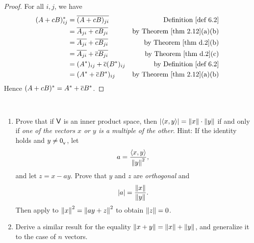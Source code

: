 \begin{proof}
For all \(i, j\), we have
\begin{align*}
    (A + cB)^*_{ij} & = \conjugatet{(A + cB)_{ji}} & \text{\DEF{6.2}} \\
    & = \conjugatet{A_{ji} + cB_{ji}} & \text{by \THM{2.12}(a)(b)} \\
    & = \conjugatet{A_{ji}} + \conjugatet{cB_{ji}} & \text{by \THM{d.2}(b)} \\
    & = \conjugatet{A_{ji}} + \conjugatet{c}\conjugatet{B_{ji}} & \text{by \THM{d.2}(c)} \\
    & = (A^*)_{ij} + \conjugatet{c}(B^*)_{ij} & \text{by \DEF{6.2}} \\
    & = (A^* + \conjugatet{c}B^*)_{ij} & \text{by \THM{2.12}(a)(b)}
\end{align*}
Hence \((A + cB)^* = A^* + \overline{c}B^*\).
\end{proof}

\begin{exercise} \label{exercise 6.1.15} \ 

\begin{enumerate}
\item Prove that if \(\textsf{V}\) is an inner product space, then \(\lvert \left< x, y \right> \rvert = \left\lVert x\right\rVert \cdot \left\lVert y\right\rVert\) if and only if \emph{one of the vectors \(x\) or \(y\) is a multiple of the other}.
Hint: If the identity holds and \(y \ne 0_{_{\textsf{V}}}\), let
\[
    a = \frac{\left< x, y \right>}{\left\lVert y\right\rVert^2},
\]
and let \(z = x - ay\).
Prove that \(y\) and \(z\) are \emph{orthogonal} and
\[
    \lvert a\rvert = \frac{\left\lVert x\right\rVert}{\left\lVert y\right\rVert}.
\]
Then apply  to \(\left\lVert x\right\rVert^2 = \left\lVert ay + z\right\rVert^2\) to obtain \(\left\lVert z\right\rVert = 0\).

\item Derive a similar result for the equality \(\left\lVert x + y\right\rVert = \left\lVert x\right\rVert + \left\lVert y\right\rVert\), and generalize it to the case of \(n\) vectors.
\end{enumerate}
\end{exercise}

